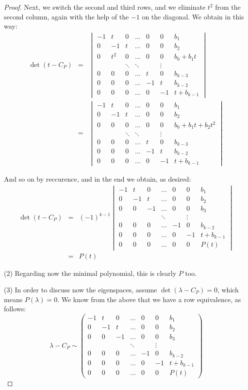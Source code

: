 \documentclass[12pt]{amsbook}
\begin{document}
\begin{proof}
Next, we switch the second and third rows, and we eliminate $t^2$ from the second column, again with the help of the $-1$ on the diagonal. We obtain in this way:
\begin{eqnarray*}
\det(t-C_P)
&=&\begin{vmatrix}
-1&t&0&\ldots&0&0&b_1\\
0&-1&t&\ldots&0&0&b_2\\
0&t^2&0&\ldots&0&0&b_0+b_1t\\
&&\ddots&\ddots&&\vdots\\
0&0&0&\ldots&t&0&b_{k-3}\\
0&0&0&\ldots&-1&t&b_{k-2}\\
0&0&0&\ldots&0&-1&t+b_{k-1}
\end{vmatrix}\\
&=&\begin{vmatrix}
-1&t&0&\ldots&0&0&b_1\\
0&-1&t&\ldots&0&0&b_2\\
0&0&0&\ldots&0&0&b_0+b_1t+b_2t^2\\
&&\ddots&\ddots&&\vdots\\
0&0&0&\ldots&t&0&b_{k-3}\\
0&0&0&\ldots&-1&t&b_{k-2}\\
0&0&0&\ldots&0&-1&t+b_{k-1}
\end{vmatrix}
\end{eqnarray*}

And so on by reccurence, and in the end we obtain, as desired:
\begin{eqnarray*}
\det(t-C_P)
&=&(-1)^{k-1}\begin{vmatrix}
-1&t&0&\ldots&0&0&b_1\\
0&-1&t&\ldots&0&0&b_2\\
0&0&-1&\ldots&0&0&b_3\\
&&&\ddots&&\vdots\\
0&0&0&\ldots&-1&0&b_{k-2}\\
0&0&0&\ldots&0&-1&t+b_{k-1}\\
0&0&0&\ldots&0&0&P(t)
\end{vmatrix}\\
&=&P(t)
\end{eqnarray*}

(2) Regarding now the minimal polynomial, this is clearly $P$ too.

\medskip

(3) In order to discuss now the eigenspaces, assume $\det(\lambda-C_P)=0$, which means $P(\lambda)=0$. We know from the above that we have a row equivalence, as follows:
$$\lambda-C_P\sim\begin{pmatrix}
-1&t&0&\ldots&0&0&b_1\\
0&-1&t&\ldots&0&0&b_2\\
0&0&-1&\ldots&0&0&b_3\\
&&&\ddots&&\vdots\\
0&0&0&\ldots&-1&0&b_{k-2}\\
0&0&0&\ldots&0&-1&t+b_{k-1}\\
0&0&0&\ldots&0&0&P(t)
\end{pmatrix}$$


\end{proof}
\end{document}
